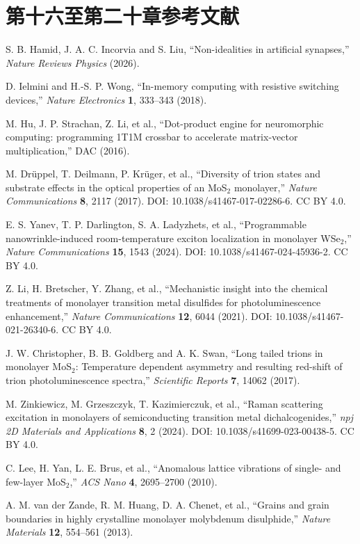 \documentclass[11pt,a4paper,openany,fontset=fandol]{ctexbook}
\begin{document}
\chapter*{第十六至第二十章参考文献}
\begin{enumerate}[label={[\arabic*]},leftmargin=3.5em]
\setcounter{enumi}{45}
\item S. B. Hamid, J. A. C. Incorvia and S. Liu, ``Non-idealities in artificial synapses,'' \textit{Nature Reviews Physics} (2026).
\item D. Ielmini and H.-S. P. Wong, ``In-memory computing with resistive switching devices,'' \textit{Nature Electronics} \textbf{1}, 333--343 (2018).
\item M. Hu, J. P. Strachan, Z. Li, et al., ``Dot-product engine for neuromorphic computing: programming 1T1M crossbar to accelerate matrix-vector multiplication,'' DAC (2016).
\item M. Drüppel, T. Deilmann, P. Krüger, et al., ``Diversity of trion states and substrate effects in the optical properties of an MoS$_2$ monolayer,'' \textit{Nature Communications} \textbf{8}, 2117 (2017). DOI: 10.1038/s41467-017-02286-6. CC BY 4.0.
\item E. S. Yanev, T. P. Darlington, S. A. Ladyzhets, et al., ``Programmable nanowrinkle-induced room-temperature exciton localization in monolayer WSe$_2$,'' \textit{Nature Communications} \textbf{15}, 1543 (2024). DOI: 10.1038/s41467-024-45936-2. CC BY 4.0.
\item Z. Li, H. Bretscher, Y. Zhang, et al., ``Mechanistic insight into the chemical treatments of monolayer transition metal disulfides for photoluminescence enhancement,'' \textit{Nature Communications} \textbf{12}, 6044 (2021). DOI: 10.1038/s41467-021-26340-6. CC BY 4.0.
\item J. W. Christopher, B. B. Goldberg and A. K. Swan, ``Long tailed trions in monolayer MoS$_2$: Temperature dependent asymmetry and resulting red-shift of trion photoluminescence spectra,'' \textit{Scientific Reports} \textbf{7}, 14062 (2017).
\item M. Zinkiewicz, M. Grzeszczyk, T. Kazimierczuk, et al., ``Raman scattering excitation in monolayers of semiconducting transition metal dichalcogenides,'' \textit{npj 2D Materials and Applications} \textbf{8}, 2 (2024). DOI: 10.1038/s41699-023-00438-5. CC BY 4.0.
\item C. Lee, H. Yan, L. E. Brus, et al., ``Anomalous lattice vibrations of single- and few-layer MoS$_2$,'' \textit{ACS Nano} \textbf{4}, 2695--2700 (2010).
\item A. M. van der Zande, R. M. Huang, D. A. Chenet, et al., ``Grains and grain boundaries in highly crystalline monolayer molybdenum disulphide,'' \textit{Nature Materials} \textbf{12}, 554--561 (2013).
\end{enumerate}
\end{document}
